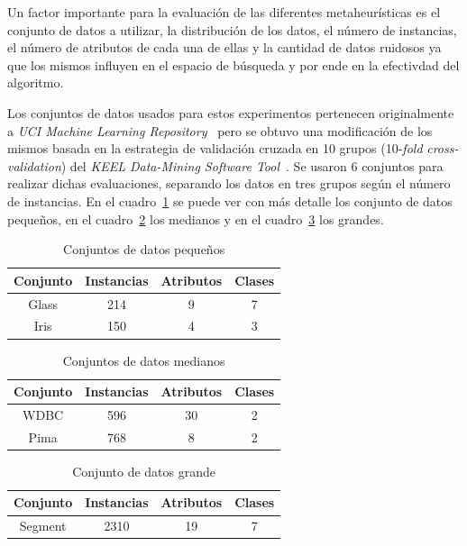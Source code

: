 \documentclass{ci5652}
\begin{document}
Un factor importante para la evaluación de las diferentes metaheurísticas es el conjunto de datos a utilizar, la distribución de los datos, el número de instancias, el número de atributos de cada una de ellas y la cantidad de datos ruidosos ya que los mismos influyen en el espacio de búsqueda y por ende en la efectivdad del algoritmo. 

Los conjuntos de datos usados para estos experimentos pertenecen originalmente a \textit{UCI Machine Learning Repository}~\cite{Lichman:2013} pero se obtuvo una modificación de los mismos basada en la estrategia de validación cruzada en 10 grupos (10-\textit{fold} \textit{cross-validation}) del \textit{KEEL Data-Mining Software Tool}~\cite{alcala2010keel}. Se usaron 6 conjuntos para realizar dichas evaluaciones, separando los datos en tres grupos según el número de instancias. En el cuadro~\ref{table:small-dataset} se puede ver con más detalle los conjunto de datos pequeños, en el cuadro~\ref{table:medium-dataset} los medianos y en el cuadro~\ref{table:large-dataset} los grandes.

\begin{table}[!h]
	\centering
	\begin{tabular}{c c c c}
	\hline
	Conjunto & Instancias & Atributos & Clases \\
	\hline
	Glass & 214 & 9 & 7 \\
	Iris & 150 & 4 & 3 \\
	\end{tabular}
	\caption{Conjuntos de datos pequeños}
	\label{table:small-dataset}
\end{table}

\begin{table}[!h]
	\centering
	\begin{tabular}{c c c c}
	\hline
	Conjunto & Instancias & Atributos & Clases \\
	\hline
	WDBC & 596 & 30 & 2 \\
	Pima & 768 & 8 & 2 \\
	\end{tabular}
	\caption{Conjuntos de datos medianos}
	\label{table:medium-dataset}
\end{table}


\begin{table}[!h]
	\centering
	\begin{tabular}{c c c c}
	\hline
	Conjunto & Instancias & Atributos & Clases \\
	\hline
	Segment & 2310 & 19 & 7 \\
	\end{tabular}
	\caption{Conjunto de datos grande}
	\label{table:large-dataset}
\end{table}
\end{document}
